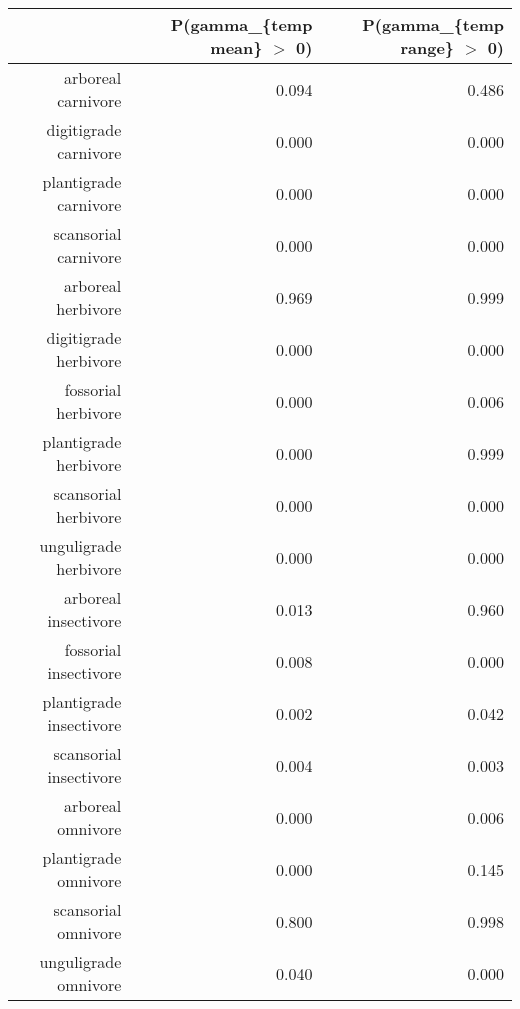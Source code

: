 \begin{table}[ht]
\centering
\begin{tabular}{rrr}
  \hline
 & P(gamma\_\{temp mean\} $>$ 0) & P(gamma\_\{temp range\} $>$ 0) \\ 
  \hline
arboreal carnivore & 0.094 & 0.486 \\ 
  digitigrade carnivore & 0.000 & 0.000 \\ 
  plantigrade carnivore & 0.000 & 0.000 \\ 
  scansorial carnivore & 0.000 & 0.000 \\ 
  arboreal herbivore & 0.969 & 0.999 \\ 
  digitigrade herbivore & 0.000 & 0.000 \\ 
  fossorial herbivore & 0.000 & 0.006 \\ 
  plantigrade herbivore & 0.000 & 0.999 \\ 
  scansorial herbivore & 0.000 & 0.000 \\ 
  unguligrade herbivore & 0.000 & 0.000 \\ 
  arboreal insectivore & 0.013 & 0.960 \\ 
  fossorial insectivore & 0.008 & 0.000 \\ 
  plantigrade insectivore & 0.002 & 0.042 \\ 
  scansorial insectivore & 0.004 & 0.003 \\ 
  arboreal omnivore & 0.000 & 0.006 \\ 
  plantigrade omnivore & 0.000 & 0.145 \\ 
  scansorial omnivore & 0.800 & 0.998 \\ 
  unguligrade omnivore & 0.040 & 0.000 \\ 
   \hline
\end{tabular}
\label{tab:occur_temp}
\end{table}
